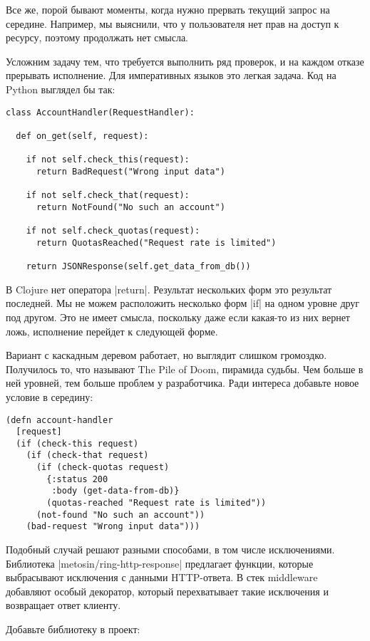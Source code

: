 Все же, порой бывают моменты, когда нужно прервать текущий запрос на
середине. Например, мы выяснили, что у пользователя нет прав на доступ к
ресурсу, поэтому продолжать нет смысла.

Усложним задачу тем, что требуется выполнить ряд проверок, и на каждом отказе
прерывать исполнение. Для императивных языков это легкая задача. Код на Python
выглядел бы так:

\begin{verbatim}
class AccountHandler(RequestHandler):

  def on_get(self, request):

    if not self.check_this(request):
      return BadRequest("Wrong input data")

    if not self.check_that(request):
      return NotFound("No such an account")

    if not self.check_quotas(request):
      return QuotasReached("Request rate is limited")

    return JSONResponse(self.get_data_from_db())
\end{verbatim}

В Clojure нет оператора \spverb|return|. Результат нескольких форм это результат
последней. Мы не можем расположить несколько форм \spverb|if| на одном уровне друг под
другом. Это не имеет смысла, поскольку даже если какая-то из них вернет ложь,
исполнение перейдет к следующей форме.

Вариант с каскадным деревом работает, но выглядит слишком громоздко. Получилось
то, что называют The Pile of Doom, пирамида судьбы. Чем больше в ней уровней,
тем больше проблем у разработчика. Ради интереса добавьте новое условие в
середину:

\begin{verbatim}
(defn account-handler
  [request]
  (if (check-this request)
    (if (check-that request)
      (if (check-quotas request)
        {:status 200
         :body (get-data-from-db)}
        (quotas-reached "Request rate is limited"))
      (not-found "No such an account"))
    (bad-request "Wrong input data")))
\end{verbatim}

Подобный случай решают разными способами, в том числе исключениями. Библиотека
\spverb|metosin/ring-http-response| предлагает функции, которые выбрасывают исключения
с данными HTTP-ответа. В стек middleware добавляют особый декоратор, который
перехватывает такие исключения и возвращает ответ клиенту.

Добавьте библиотеку в проект:

